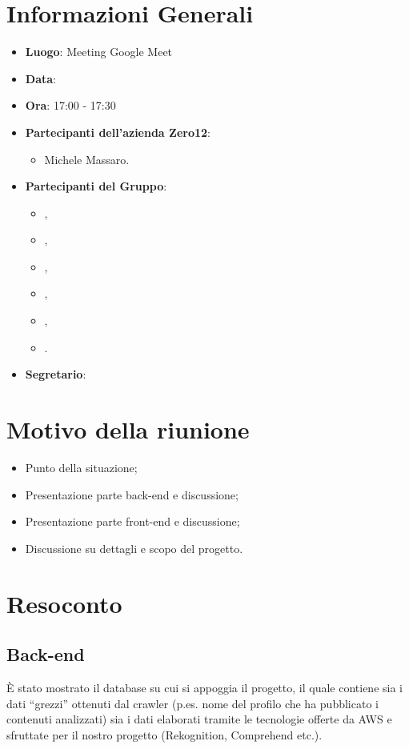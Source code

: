 \section{Informazioni Generali}

\begin{itemize}
\item{\textbf{Luogo}}: Meeting Google Meet
\item{\textbf{Data}}: \D{}
\item{\textbf{Ora}}: 17:00 - 17:30
\item{\textbf{Partecipanti dell'azienda Zero12}}: 
	\begin{itemize}
	\item{Michele Massaro.} 
	\end{itemize} 
\item{\textbf{Partecipanti del Gruppo}}: 
	\begin{itemize}
	\item{\EP{},} 
	\item{\FP{},}
	\item{\GC{},}
	\item{\LW{},}	
	\item{\MB{},}
	\item{\PV{}.}
	\end{itemize} 
\item{\textbf{Segretario}}: \GC{}
\end{itemize}

\section{Motivo della riunione}
\begin{itemize}
	\item {Punto della situazione;}
	\item {Presentazione parte back-end e discussione;}
	\item {Presentazione parte front-end e discussione;}
	\item {Discussione su dettagli e scopo del progetto.}
\end{itemize}

\section{Resoconto}
\subsection{Back-end}
È stato mostrato il database su cui si appoggia il progetto, il quale contiene sia i dati “grezzi” ottenuti dal crawler (p.es. nome del profilo che ha pubblicato i contenuti analizzati) sia i dati elaborati tramite le tecnologie offerte da AWS e sfruttate per il nostro progetto (Rekognition, Comprehend etc.).  \\

